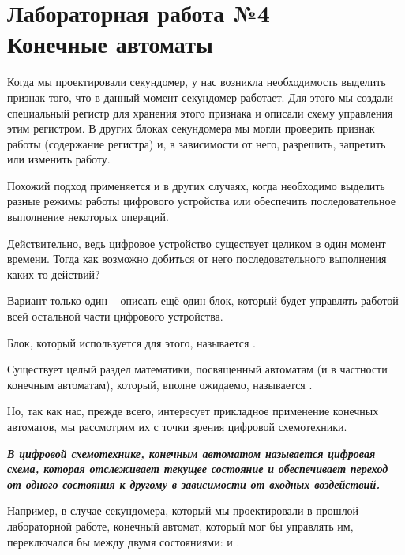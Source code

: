 \chapter{Лабораторная работа №4\\Конечные автоматы} 

\par{Когда мы проектировали секундомер, у нас возникла необходимость выделить признак того, что в данный момент секундомер работает. Для этого мы создали специальный регистр для хранения этого признака и описали схему управления этим регистром. В других блоках секундомера мы могли проверить признак работы (содержание регистра) и, в зависимости от него, разрешить, запретить или изменить работу.}

\par{Похожий подход применяется и в других случаях, когда необходимо выделить разные режимы работы цифрового устройства или обеспечить последовательное выполнение некоторых операций.}

\par{Действительно, ведь цифровое устройство существует целиком в один момент времени. Тогда как возможно добиться от него последовательного выполнения каких-то действий?}

\par{Вариант только один – описать ещё один блок, который будет управлять работой всей остальной части цифрового устройства.}

\par{Блок, который используется для этого, называется .}

\par{Существует целый раздел математики, посвященный автоматам (и в частности конечным автоматам), который, вполне ожидаемо, называется .}

\par{Но, так как нас, прежде всего, интересует прикладное применение конечных автоматов, мы рассмотрим их с точки зрения цифровой схемотехники.}

\par{\textbf{\textit{В цифровой схемотехнике, конечным автоматом называется цифровая схема, которая отслеживает текущее состояние и обеспечивает переход от одного состояния к другому в зависимости от входных воздействий.}}}

\par{Например, в случае секундомера, который мы проектировали в прошлой лабораторной работе, конечный автомат, который мог бы управлять им, переключался бы между двумя состояниями:  и .}

